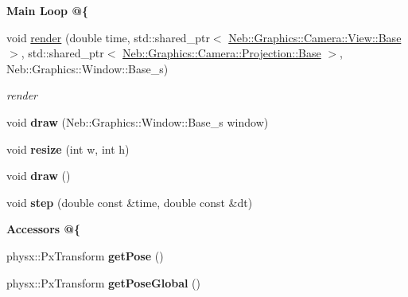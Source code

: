 \begin{Indent}{\bf \-Main \-Loop @\{}\par
\begin{DoxyCompactItemize}
\item 
\hypertarget{classNeb_1_1Scene_1_1Base_a58735835003f4d9c76855325baba4e38}{void \hyperlink{classNeb_1_1Scene_1_1Base_a58735835003f4d9c76855325baba4e38}{render} (double time, std\-::shared\-\_\-ptr$<$ \hyperlink{classNeb_1_1Graphics_1_1Camera_1_1View_1_1Base}{\-Neb\-::\-Graphics\-::\-Camera\-::\-View\-::\-Base} $>$, std\-::shared\-\_\-ptr$<$ \hyperlink{classNeb_1_1Graphics_1_1Camera_1_1Projection_1_1Base}{\-Neb\-::\-Graphics\-::\-Camera\-::\-Projection\-::\-Base} $>$, \-Neb\-::\-Graphics\-::\-Window\-::\-Base\-\_\-s)}\label{classNeb_1_1Scene_1_1Base_a58735835003f4d9c76855325baba4e38}

\begin{DoxyCompactList}\small\item\em render \end{DoxyCompactList}\item 
\hypertarget{classNeb_1_1Scene_1_1Base_aa4f3cc9f025a07f7f915a235185aaf27}{void {\bfseries draw} (\-Neb\-::\-Graphics\-::\-Window\-::\-Base\-\_\-s window)}\label{classNeb_1_1Scene_1_1Base_aa4f3cc9f025a07f7f915a235185aaf27}

\item 
\hypertarget{classNeb_1_1Scene_1_1Base_a9b1fbc5ffb04397abf8dc938544c5470}{void {\bfseries resize} (int w, int h)}\label{classNeb_1_1Scene_1_1Base_a9b1fbc5ffb04397abf8dc938544c5470}

\item 
\hypertarget{classNeb_1_1Scene_1_1Base_aa383aeca20d4ca9212ad5d88f82fe2e3}{void {\bfseries draw} ()}\label{classNeb_1_1Scene_1_1Base_aa383aeca20d4ca9212ad5d88f82fe2e3}

\item 
\hypertarget{classNeb_1_1Scene_1_1Base_acb2bfc32ddb49ffcc93eb7a4b75bc7f1}{void {\bfseries step} (double const \&time, double const \&dt)}\label{classNeb_1_1Scene_1_1Base_acb2bfc32ddb49ffcc93eb7a4b75bc7f1}

\end{DoxyCompactItemize}
\end{Indent}
\begin{Indent}{\bf \-Accessors @\{}\par
\begin{DoxyCompactItemize}
\item 
\hypertarget{classNeb_1_1Scene_1_1Base_a9425aed0f7a62b57cc9e85838d3d8e93}{physx\-::\-Px\-Transform {\bfseries get\-Pose} ()}\label{classNeb_1_1Scene_1_1Base_a9425aed0f7a62b57cc9e85838d3d8e93}

\item 
\hypertarget{classNeb_1_1Scene_1_1Base_a9c063f947be2488466ded4657dc693e5}{physx\-::\-Px\-Transform {\bfseries get\-Pose\-Global} ()}\label{classNeb_1_1Scene_1_1Base_a9c063f947be2488466ded4657dc693e5}

\end{DoxyCompactItemize}
\end{Indent}
